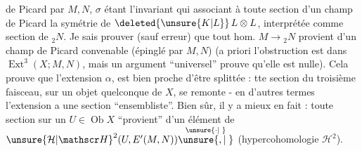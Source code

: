  de Picard  par $M,N$, $\sigma$ étant l'invariant qui  associant à toute section  d'un champ de Picard la symétrie de $\deleted{\unsure{K|L}}\,L\otimes L$, interprétée comme section de ${}_{2}N$. Je sais prouver (sauf erreur) que tout hom. $M\to{}_{2}N$ provient d'un champ de Picard convenable (épinglé par $M,N$) (a priori l'obstruction est dans $\operatorname{Ext}^{3}(X;M,N)$, mais un argument ``universel'' prouve qu'elle est nulle). Cela prouve que l'extension $\alpha$, est bien proche d'être splittée : tte section du troisième faisceau, sur un objet quelconque de $X$, se remonte - en d'autres termes l'extension a une section ``ensembliste''. Bien sûr, il y a mieux en fait : toute section sur un $U\in\operatorname{Ob}X$ ``provient'' d'un élément de ${\unsure{\mathcal H|\mathscr H}}^{2}(U,E'(M,N))\overset{\unsure{\cdot|\phantom{\cdot}}}{\unsure{,|\phantom{,}}}$ (hypercohomologie $\mathcal H^{2}$).
